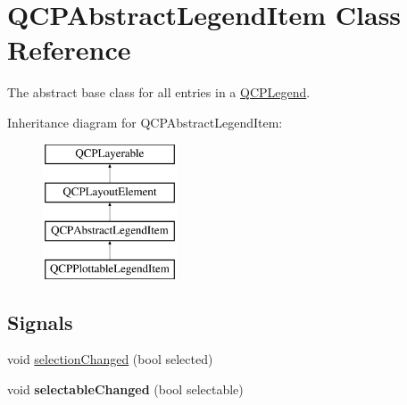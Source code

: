 \hypertarget{classQCPAbstractLegendItem}{\section{\-Q\-C\-P\-Abstract\-Legend\-Item \-Class \-Reference}
\label{classQCPAbstractLegendItem}
}


\-The abstract base class for all entries in a \hyperlink{classQCPLegend}{\-Q\-C\-P\-Legend}.  


\-Inheritance diagram for \-Q\-C\-P\-Abstract\-Legend\-Item\-:\begin{figure}[H]
\begin{center}
\leavevmode
\includegraphics[height=4.000000cm]{classQCPAbstractLegendItem}
\end{center}
\end{figure}
\subsection*{\-Signals}
\begin{DoxyCompactItemize}
\item 
void \hyperlink{classQCPAbstractLegendItem_a7cb61fdfbaf69c590bacb8f9e7099d9e}{selection\-Changed} (bool selected)
\item 
\hypertarget{classQCPAbstractLegendItem_abc4d779b938cc9235f9196737dbaa6bd}{void {\bfseries selectable\-Changed} (bool selectable)}\label{classQCPAbstractLegendItem_abc4d779b938cc9235f9196737dbaa6bd}

\end{DoxyCompactItemize}
